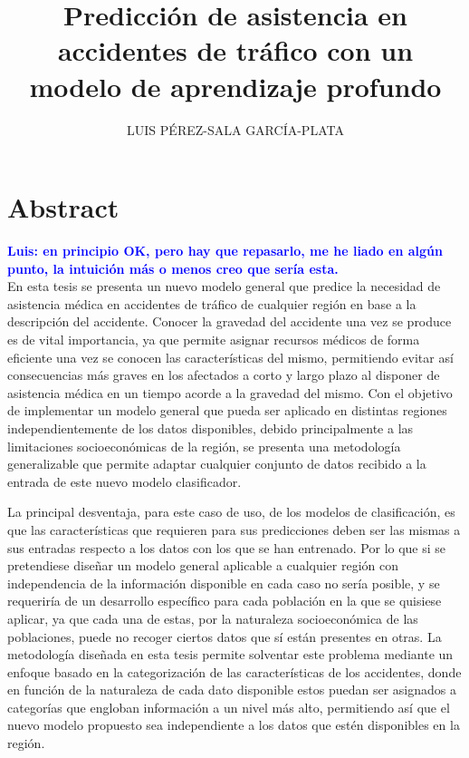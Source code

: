 \documentclass{uathesis-es}
\title{Predicción de asistencia en accidentes de tráfico con un modelo de aprendizaje profundo}
\author{LUIS PÉREZ-SALA GARCÍA-PLATA}
\begin{document}
\maketitle

\tableofcontents



\section{Abstract}

\textcolor{blue}{\textbf{Luis: en principio OK, pero hay que repasarlo, me he liado en algún punto, la intuición más o menos creo que sería esta.}}\\

En esta tesis se presenta un nuevo modelo general que predice la necesidad de asistencia médica en accidentes de tráfico de cualquier región en base a la descripción del accidente. Conocer la gravedad del accidente una vez se produce es de vital importancia, ya que permite asignar recursos médicos de forma eficiente una vez se conocen las características del mismo, permitiendo evitar así consecuencias más graves en los afectados a corto y largo plazo al disponer de asistencia médica en un tiempo acorde a la gravedad del mismo. Con el objetivo de implementar un modelo general que pueda ser aplicado en distintas regiones independientemente de los datos disponibles, debido principalmente a las limitaciones socioeconómicas de la región, se presenta una metodología generalizable que permite adaptar cualquier conjunto de datos recibido a la entrada de este nuevo modelo clasificador.

La principal desventaja, para este caso de uso, de los modelos de clasificación, es que las características que requieren para sus predicciones deben ser las mismas a sus entradas respecto a los datos con los que se han entrenado. Por lo que si se pretendiese diseñar un modelo general aplicable a cualquier región con independencia de la información disponible en cada caso no sería posible, y se requeriría de un desarrollo específico para cada población en la que se quisiese aplicar, ya que cada una de estas, por la naturaleza socioeconómica de las poblaciones, puede no recoger ciertos datos que sí están presentes en otras. La metodología diseñada en esta tesis permite solventar este problema mediante un enfoque basado en la categorización de las características de los accidentes, donde en función de la naturaleza de cada dato disponible estos puedan ser asignados a categorías que engloban información a un nivel más alto, permitiendo así que el nuevo modelo propuesto sea independiente a los datos que estén disponibles en la región.
\end{document}
